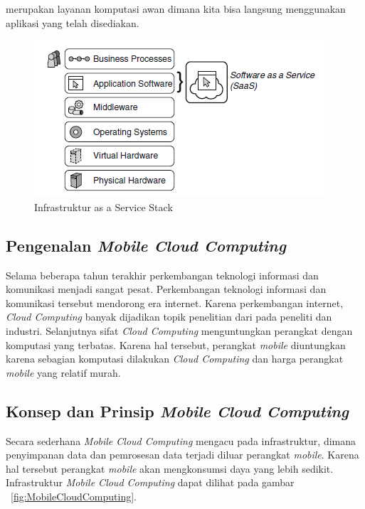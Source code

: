 \begin{itemize}
	merupakan layanan komputasi awan dimana kita bisa langsung menggunakan aplikasi yang telah disediakan.
	\begin{figure}[h]
		\centering
			\includegraphics{Gambar/saas-infrastruktur}
		\caption{Infrastruktur as a Service Stack}
		\label{fig:saas-infrastruktur}
	\end{figure}
\end{itemize}

\subsection{Pengenalan \textit{Mobile Cloud Computing}}
\label{subsec:pengenalanmcc}
\hspace{0,5cm} Selama beberapa tahun terakhir perkembangan teknologi informasi dan komunikasi menjadi sangat pesat. Perkembangan teknologi informasi dan komunikasi tersebut mendorong era internet. Karena perkembangan internet, \textit{Cloud Computing} banyak dijadikan topik penelitian dari pada peneliti dan industri. Selanjutnya sifat \textit{Cloud Computing} menguntungkan perangkat dengan komputasi yang terbatas. Karena hal tersebut, perangkat \textit{mobile} diuntungkan karena sebagian komputasi dilakukan \textit{Cloud Computing} dan harga perangkat \textit{mobile} yang relatif murah\cite{mcc}.  

\subsection{Konsep dan Prinsip \textit{Mobile Cloud Computing}}
\label{subsec:konsepmcc}
\hspace{0,5cm} Secara sederhana \textit{Mobile Cloud Computing} mengacu  pada infrastruktur, dimana penyimpanan data dan pemrosesan data terjadi diluar perangkat \textit{mobile}\cite{mcc}. Karena hal tersebut perangkat \textit{mobile} akan mengkonsumsi daya yang lebih sedikit. Infrastruktur \textit{Mobile Cloud Computing} dapat dilihat pada gambar ~\ref{fig:MobileCloudComputing}.

